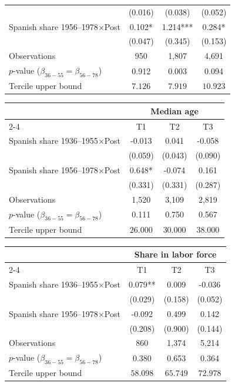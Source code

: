 \begin{table}[!h]
\begin{tabular*}{\textwidth}{l@{\extracolsep{\fill}}ccc}
 & (0.016) & (0.038) & (0.052) \\
Spanish share 1956--1978\(\times\)Post & 0.102* & 1.214*** & 0.284* \\
 & (0.047) & (0.345) & (0.153) \\
\addlinespace
Observations & 950 & 1,807 & 4,691 \\
\(p\)-value (\(\beta_{36{-}55}=\beta_{56{-}78}\)) & 0.912 & 0.003 & 0.094 \\
Tercile upper bound & \(7.126\) & \(7.919\) & \(10.923\) \\
\hline
\end{tabular*}
\begin{tabular*}{\textwidth}{l@{\extracolsep{\fill}}ccc}
& \multicolumn{3}{c}{Median age} \\
\cmidrule(l){2-4}
& T1 & T2 & T3 \\
\hline
Spanish share 1936--1955\(\times\)Post & -0.013 & 0.041 & -0.058 \\
 & (0.059) & (0.043) & (0.090) \\
Spanish share 1956--1978\(\times\)Post & 0.648* & -0.074 & 0.161 \\
 & (0.331) & (0.331) & (0.287) \\
\addlinespace
Observations & 1,520 & 3,109 & 2,819 \\
\(p\)-value (\(\beta_{36{-}55}=\beta_{56{-}78}\)) & 0.111 & 0.750 & 0.567 \\
Tercile upper bound & \(26.000\) & \(30.000\) & \(38.000\) \\
\hline
\end{tabular*}
\begin{tabular*}{\textwidth}{l@{\extracolsep{\fill}}ccc}
& \multicolumn{3}{c}{Share in labor force} \\
\cmidrule(l){2-4}
& T1 & T2 & T3 \\
\hline
Spanish share 1936--1955\(\times\)Post & 0.079** & 0.009 & -0.036 \\
 & (0.029) & (0.158) & (0.052) \\
Spanish share 1956--1978\(\times\)Post & -0.092 & 0.499 & 0.142 \\
 & (0.208) & (0.900) & (0.144) \\
\addlinespace
Observations & 860 & 1,374 & 5,214 \\
\(p\)-value (\(\beta_{36{-}55}=\beta_{56{-}78}\)) & 0.380 & 0.653 & 0.364 \\
Tercile upper bound & \(58.098\) & \(65.749\) & \(72.978\) \\
\hline
\end{tabular*}

\end{table}
